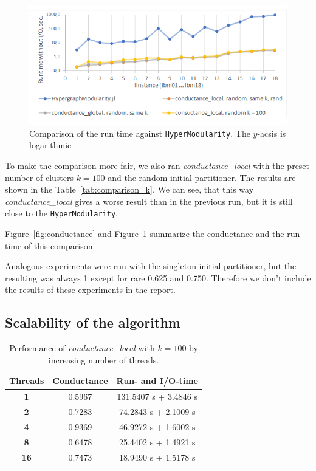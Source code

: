 \documentclass[acmsmall,nonacm,screen,review]{acmart}
\begin{document}
\begin{figure}[t]
    \centering 
    \includegraphics{time_comparison.png}
    \caption{Comparison of the run time against \texttt{HyperModularity}. The $y$-acsis is logarithmic}%
    \label{fig:time}
\end{figure}

To make the comparison more fair, we also ran \textit{conductance\_local} with the 
preset number of clusters $k = 100$ and the random initial partitioner. 
The results are shown in the Table~\ref{tab:comparison_k}. We can see, that
this way \textit{conductance\_local} gives a worse result than in the previous run,
but it is still close to the \texttt{HyperModularity}.

Figure~\ref{fig:conductance} and Figure~\ref{fig:time} summarize the conductance 
and the run time of this comparison. 

\medskip
Analogous experiments were run with the singleton initial partitioner, but the resulting
was always 1 except for rare 0.625 and 0.750. Therefore we don't include the results
of these experiments in the report.

\subsection{Scalability of the algorithm}

\begin{table}
    \centering
    \begin{tabular}{|c|c|c|} \hline
        \textbf{Threads} & \textbf{Conductance} & \textbf{Run- and I/O-time} \\ \hline
        \textbf{1} & 0.5967 & 131.5407 s  + 3.4846 s \\ 
        \textbf{2} & 0.7283 & 74.2843 s + 2.1009 s \\ 
        \textbf{4} & 0.9369 & 46.9272 s  + 1.6002 s \\ 
        \textbf{8} & 0.6478 & 25.4402 s + 1.4921 s \\ 
        \textbf{16} & 0.7473 & 18.9490 s  + 1.5178 s \\ \hline
    \end{tabular}
    \caption{Performance of \textit{conductance\_local} with $k = 100$ 
    by increasing number of threads.}
    \label{tab:scalability_t}
\end{table}
\end{document}

